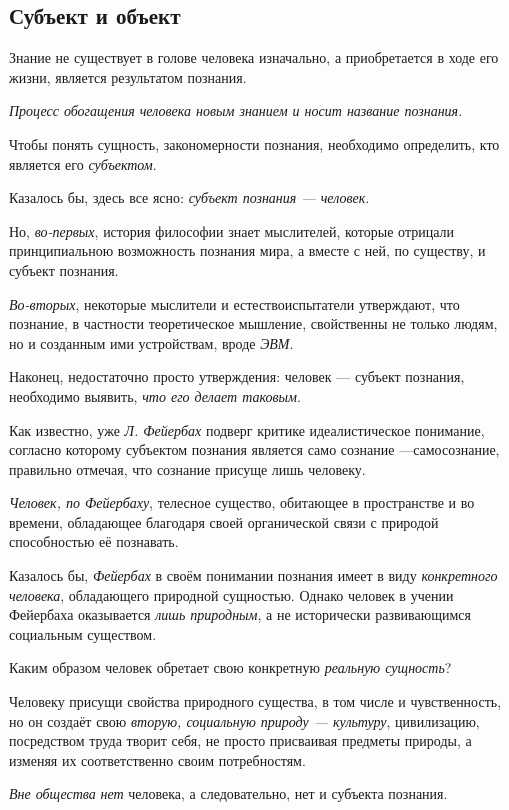 \documentclass[a4paper,14pt,russian]{extreport}
\begin{document}
\subsection{Субъект и объект}

Знание не существует в голове человека изначально, а приобретается в ходе его жизни, является результатом познания.

\emph{Процесс обогащения человека новым знанием и носит название познания.}

Чтобы понять сущность, закономерности познания, необходимо определить, кто является его \emph{субъектом}.

Казалось бы, здесь все ясно: \emph{субъект познания --- человек}.

Но, \emph{во-первых}, история философии знает мыслителей, которые отрицали принципиальною возможность познания мира, а вместе с ней, по существу, и субъект познания.

\emph{Во-вторых}, некоторые мыслители и естествоиспытатели утверждают, что познание, в частности теоретическое мышление, свойственны не только людям, но и созданным ими устройствам, вроде \emph{ЭВМ}.

Наконец, недостаточно просто утверждения: человек --- субъект познания, необходимо выявить, \emph{что его делает таковым}.

Как известно, уже \emph{Л. Фейербах} подверг критике идеалистическое понимание, согласно которому субъектом познания является само сознание ---самосознание, правильно отмечая, что сознание присуще лишь человеку.

\emph{Человек, по Фейербаху}, телесное существо, обитающее в пространстве и во времени, обладающее благодаря своей органической связи с природой способностью её познавать.

Казалось бы, \emph{Фейербах} в своём понимании познания имеет в виду \emph{конкретного человека}, обладающего природной сущностью. Однако человек в учении Фейербаха оказывается \emph{лишь природным}, а не исторически развивающимся социальным существом.

Каким образом человек обретает свою конкретную \emph{реальную сущность}?

Человеку присущи свойства природного существа, в том числе и чувственность, но он создаёт свою \emph{вторую, социальную природу --- культуру}, цивилизацию, посредством труда творит себя, не просто присваивая предметы природы, а изменяя их соответственно своим потребностям.

\emph{Вне общества} \emph{нет} человека, а следовательно, нет и субъекта познания.
\end{document}
